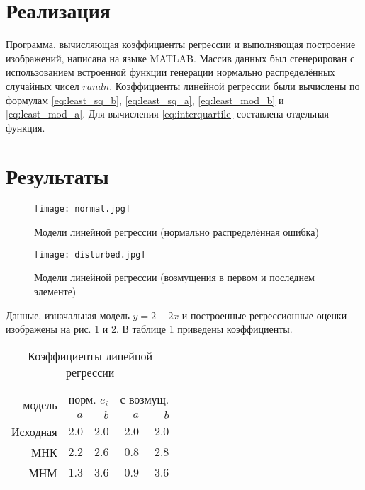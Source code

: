\documentclass[main.tex]{subfiles}
\begin{document}
\section{Реализация}
Программа, вычисляющая коэффициенты регрессии и выполняющая построение изображений, написана на языке MATLAB. Массив данных был сгенерирован с использованием встроенной функции генерации нормально распределённых случайных чисел $randn$. Коэффициенты линейной регрессии были вычислены по формулам \eqref{eq:least_sq_b}, \eqref{eq:least_sq_a}, \eqref{eq:least_mod_b} и \eqref{eq:least_mod_a}. Для вычисления \eqref{eq:interquartile} составлена отдельная функция. 

\newpage
\section{Результаты}

\begin{figure}[H]
	\centering \texttt{[image: normal.jpg]}
	\caption{Модели линейной регрессии (нормально распределённая ошибка)}
	\label{img:normal}
\end{figure}
\begin{figure}[H]
	\centering \texttt{[image: disturbed.jpg]}
	\caption{Модели линейной регрессии (возмущения в первом и последнем элементе)}
	\label{img:disturbed}
\end{figure}

Данные, изначальная модель $y=2+2x$ и построенные регрессионные оценки изображены на рис. \ref{img:normal} и \ref{img:disturbed}. В таблице \ref{table} приведены коэффициенты.

\begin{table}[H]
	\centering
	\caption{Коэффициенты линейной регрессии}
	\begin{tabular}{*5r}
		\toprule
		\multirow{2}{*}{модель} & \multicolumn{2}{c}{норм. $e_i$}  & \multicolumn{2}{c}{с возмущ.} \\
		& $a$ & $b$ & $a$ & $b$ \\
		\midrule
		Исходная & $2.0$ & $2.0$ & $2.0$ & $2.0$ \\
		МНК      & $2.2$ & $2.6$ & $0.8$ & $2.8$ \\
		МНМ      & $1.3$ & $3.6$ & $0.9$ & $3.6$ \\
		\bottomrule
	\end{tabular}
	\label{table}
\end{table}
\end{document}
